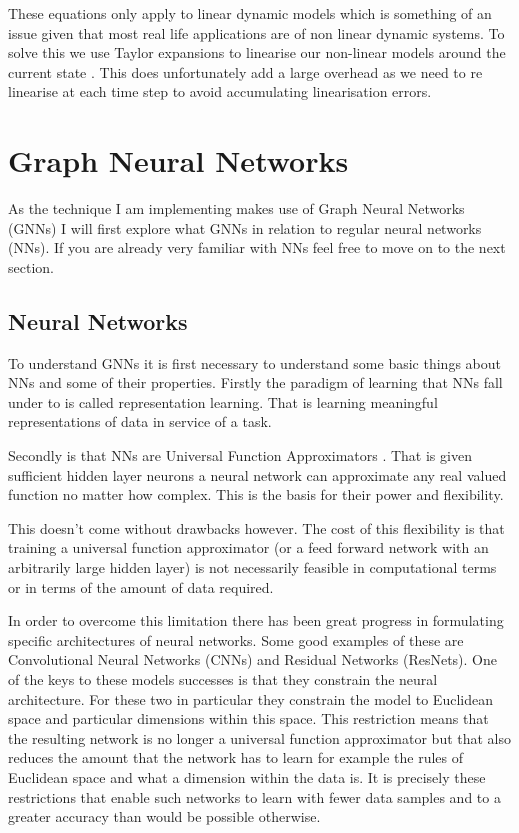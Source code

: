 \documentclass[]{../resources/final_report}
\begin{document}
These equations only apply to linear dynamic models which is something of an issue given that most real life applications are of non linear dynamic systems. To solve this we use Taylor expansions to linearise our non-linear models around the current state \cite{ExtendedKalmanNasa}. This does unfortunately add a large overhead as we need to re linearise at each time step to avoid accumulating linearisation errors.

\section{Graph Neural Networks}

As the technique I am implementing makes use of Graph Neural Networks (GNNs) I will first explore what GNNs in relation to regular neural networks (NNs). If you are already very familiar with NNs feel free to move on to the next section.

\subsection{Neural Networks}
To understand GNNs it is first necessary to understand some basic things about NNs and some of their properties. Firstly the paradigm of learning that NNs fall under to is called representation learning. That is learning meaningful representations of data in service of a task.

Secondly is that NNs are Universal Function Approximators \cite{Hornik}. That is given sufficient hidden layer neurons a neural network can approximate any real valued function no matter how complex. This is the basis for their power and flexibility.

This doesn't come without drawbacks however. The cost of this flexibility is that training a universal function approximator (or a feed forward network with an arbitrarily large hidden layer) is not necessarily feasible in computational terms or in terms of the amount of data required. 

In order to overcome this limitation there has been great progress in formulating specific architectures of neural networks. Some good examples of these are Convolutional Neural Networks (CNNs) and Residual Networks (ResNets). One of the keys to these models successes is that they constrain the neural architecture. For these two in particular they constrain the model to Euclidean space and particular dimensions within this space. This restriction means that the resulting network is no longer a universal function approximator but that also reduces the amount that the network has to learn for example the rules of Euclidean space and what a dimension within the data is. It is precisely these restrictions that enable such networks to learn with fewer data samples and to a greater accuracy than would be possible otherwise.
\end{document}
